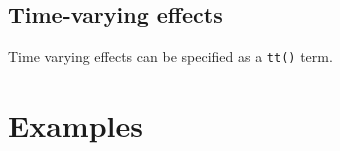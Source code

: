 \documentclass[12pt]{article}
\begin{document}
\subsection{Time-varying effects}
Time varying effects can be specified as a \texttt{tt()} term.

\section{Examples}


\begin{singlespace}

\scriptsize

\end{singlespace}
\end{document}
